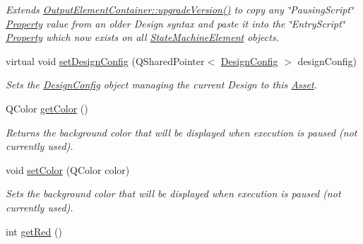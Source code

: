 \begin{DoxyCompactItemize}
\begin{DoxyCompactList}\small\item\em Extends \hyperlink{class_picto_1_1_u_i_enabled_a12c0d0357c85854db9220c72c4941b15}{Output\-Element\-Container\-::upgrade\-Version()} to copy any \char`\"{}\-Pausing\-Script\char`\"{} \hyperlink{class_picto_1_1_property}{Property} value from an older Design syntax and paste it into the \char`\"{}\-Entry\-Script\char`\"{} \hyperlink{class_picto_1_1_property}{Property} which now exists on all \hyperlink{class_picto_1_1_state_machine_element}{State\-Machine\-Element} objects. \end{DoxyCompactList}\item 
virtual void \hyperlink{class_picto_1_1_pause_point_a1a7127028b14f51978107f9d3fe1bafd}{set\-Design\-Config} (Q\-Shared\-Pointer$<$ \hyperlink{class_picto_1_1_design_config}{Design\-Config} $>$ design\-Config)
\begin{DoxyCompactList}\small\item\em Sets the \hyperlink{class_picto_1_1_design_config}{Design\-Config} object managing the current Design to this \hyperlink{class_picto_1_1_asset}{Asset}. \end{DoxyCompactList}\item 
\hypertarget{class_picto_1_1_pause_point_a192d833de302d66bab99cebc98072781}{Q\-Color \hyperlink{class_picto_1_1_pause_point_a192d833de302d66bab99cebc98072781}{get\-Color} ()}\label{class_picto_1_1_pause_point_a192d833de302d66bab99cebc98072781}

\begin{DoxyCompactList}\small\item\em Returns the background color that will be displayed when execution is paused (not currently used). \end{DoxyCompactList}\item 
\hypertarget{class_picto_1_1_pause_point_ab590977caae03ae49b62c5a774241a7e}{void \hyperlink{class_picto_1_1_pause_point_ab590977caae03ae49b62c5a774241a7e}{set\-Color} (Q\-Color color)}\label{class_picto_1_1_pause_point_ab590977caae03ae49b62c5a774241a7e}

\begin{DoxyCompactList}\small\item\em Sets the background color that will be displayed when execution is paused (not currently used). \end{DoxyCompactList}\item 
\hypertarget{class_picto_1_1_pause_point_ad5c4395dc6cdcf2e424254744bfbeb91}{int \hyperlink{class_picto_1_1_pause_point_ad5c4395dc6cdcf2e424254744bfbeb91}{get\-Red} ()}\label{class_picto_1_1_pause_point_ad5c4395dc6cdcf2e424254744bfbeb91}


\end{DoxyCompactItemize}
